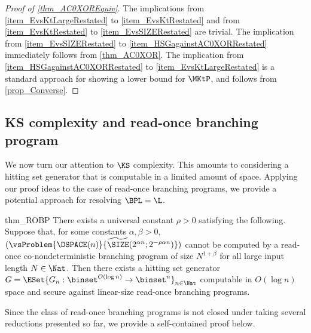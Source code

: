 \documentclass[11pt]{article}
\numberwithin{equation}{section}
\theoremstyle{definition}
\theoremstyle{plain}
\begin{document}
\begin{proof}
  [Proof of \cref{thm_AC0XOREquiv}]
  The implications from \cref{item_EvsKtLargeRestated} to \cref{item_EvsKtRestated} and from \cref{item_EvsKtRestated} to \cref{item_EvsSIZERestated} are trivial.
  The implication from \cref{item_EvsSIZERestated} to \cref{item_HSGagainstAC0XORRestated} immediately follows from \cref{thm_AC0XOR}.
  The implication from \cref{item_HSGagainstAC0XORRestated} to \cref{item_EvsKtLargeRestated} is a standard approach for showing a lower bound for $\MKtP$,
  and follows from \cref{prop_Converse}.
\end{proof}



\subsection{KS complexity and read-once branching program}
\label{section_KSandROBP}

We now turn our attention to $\KS$ complexity.
This amounts to considering a hitting set generator that is computable in a limited amount of space.
Applying our proof ideas to the case of read-once branching programs,
we provide a potential approach for resolving $\BPL = \L$.


\begin{restatetheorem}
  {thm_ROBP}
  There exists a universal constant $\rho > 0$ satisfying the following.
  Suppose that, for some constants $\alpha, \beta > 0$,
  $(\vsProblem{\DSPACE(n)} { \widetilde{\SIZE}(2^{\alpha n}; 2^{- \rho \alpha n }) })$ cannot
  be computed by a read-once co-nondeterministic branching program of size $N^{1 + \beta}$
  for all large input length $N \in \Nat$.
  Then there exists a hitting set generator $G = \ESet{ G_n : \binset^{O(\log n)} \to \binset^n }_{n \in \Nat} $ computable in $O(\log n)$ space and secure against linear-size read-once branching programs.
\end{restatetheorem}

Since the class of read-once branching programs is not closed under taking several reductions presented so far,
we provide a self-contained proof below.

%
%
%
%
%
%
%
%
%
%
%
%
%
%
%
%
%
%
%
%
\end{document}
